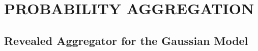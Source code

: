 \documentclass[12pt]{article}
\theoremstyle{definition}
\theoremstyle{definition}
\begin{document}
\section{PROBABILITY AGGREGATION}
\label{aggregation}
\subsection{Revealed Aggregator for the Gaussian Model}
\end{document}
